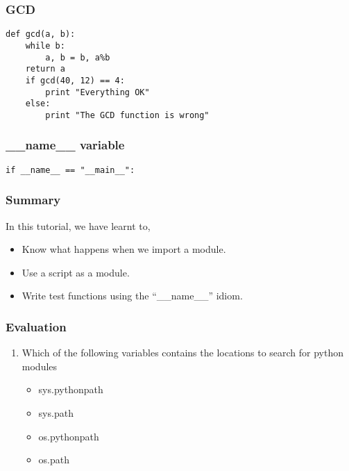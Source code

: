 \documentclass[17pt,compress]{beamer}
\newcounter{saveenumi}
\newcommand{\seti}{\setcounter{saveenumi}{\value{enumi}}}
\begin{document}
\begin{frame}[fragile]
\frametitle{GCD}
\label{sec-4}

\lstset{language=Python}

\begin{footnotesize}
\begin{lstlisting}
def gcd(a, b):
    while b:
        a, b = b, a%b
    return a
    if gcd(40, 12) == 4:
        print "Everything OK"
    else:
        print "The GCD function is wrong"
\end{lstlisting}
\end{footnotesize}

\end{frame}
\begin{frame}[fragile]
\frametitle{\_\_name\_\_ variable}
\label{sec-5}

\lstset{language=Python}
\begin{lstlisting}
if __name__ == "__main__":
\end{lstlisting}
\end{frame}
\begin{frame}
\frametitle{Summary}
\label{sec-6}

In this tutorial, we have learnt to,

\begin{itemize}
\item Know what happens when we import a module.
\item Use a script as a module.
\item Write test functions using the ``\_\_name\_\_'' idiom.
\end{itemize}
\end{frame}
\begin{frame}
\frametitle{Evaluation}
\label{sec-7.1}

\begin{enumerate}
\item Which of the following variables contains the locations to search for
   python modules\pause
	\begin{itemize}
	\item sys.pythonpath
	\item sys.path
	\item os.pythonpath
	\item os.path
	\end{itemize}\pause
\seti
\end{enumerate}
\end{frame}
\end{document}
